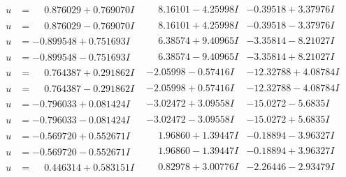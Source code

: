 \documentclass[1p]{elsarticle_modified}
\theoremstyle{definition}
\begin{document}
$$\begin{array}{c|c|c}
\begin{aligned}
u &= \phantom{-}0.876029 + 0.769070 I\end{aligned}
 & \phantom{-}8.16101 - 4.25998 I & -0.39518 + 3.37976 I \\ \hline\begin{aligned}
u &= \phantom{-}0.876029 - 0.769070 I\end{aligned}
 & \phantom{-}8.16101 + 4.25998 I & -0.39518 - 3.37976 I \\ \hline\begin{aligned}
u &= -0.899548 + 0.751693 I\end{aligned}
 & \phantom{-}6.38574 + 9.40965 I & -3.35814 - 8.21027 I \\ \hline\begin{aligned}
u &= -0.899548 - 0.751693 I\end{aligned}
 & \phantom{-}6.38574 - 9.40965 I & -3.35814 + 8.21027 I \\ \hline\begin{aligned}
u &= \phantom{-}0.764387 + 0.291862 I\end{aligned}
 & -2.05998 - 0.57416 I & -12.32788 + 4.08784 I \\ \hline\begin{aligned}
u &= \phantom{-}0.764387 - 0.291862 I\end{aligned}
 & -2.05998 + 0.57416 I & -12.32788 - 4.08784 I \\ \hline\begin{aligned}
u &= -0.796033 + 0.081424 I\end{aligned}
 & -3.02472 + 3.09558 I & -15.0272 - 5.6835 I \\ \hline\begin{aligned}
u &= -0.796033 - 0.081424 I\end{aligned}
 & -3.02472 - 3.09558 I & -15.0272 + 5.6835 I \\ \hline\begin{aligned}
u &= -0.569720 + 0.552671 I\end{aligned}
 & \phantom{-}1.96860 + 1.39447 I & -0.18894 - 3.96327 I \\ \hline\begin{aligned}
u &= -0.569720 - 0.552671 I\end{aligned}
 & \phantom{-}1.96860 - 1.39447 I & -0.18894 + 3.96327 I \\ \hline\begin{aligned}
u &= \phantom{-}0.446314 + 0.583151 I\end{aligned}
 & \phantom{-}0.82978 + 3.00776 I & -2.26446 - 2.93479 I \\ \hline\begin{aligned}

\end{aligned}
\end{array}$$
\end{document}
